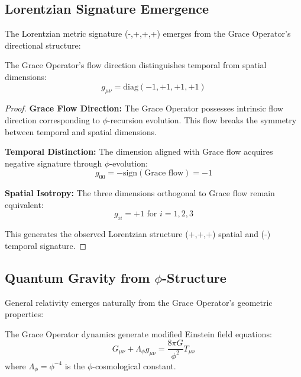 \subsection{Lorentzian Signature Emergence}

The Lorentzian metric signature (-,+,+,+) emerges from the Grace Operator's directional structure:

\begin{theorem}
The Grace Operator's flow direction distinguishes temporal from spatial dimensions:
\begin{equation}
g_{\mu\nu} = \text{diag}(-1, +1, +1, +1)
\label{eq:lorentzian_signature}
\end{equation}
\end{theorem}

\begin{proof}
\textbf{Grace Flow Direction:} The Grace Operator possesses intrinsic flow direction corresponding to $\phi$-recursion evolution. This flow breaks the symmetry between temporal and spatial dimensions.

\textbf{Temporal Distinction:} The dimension aligned with Grace flow acquires negative signature through $\phi$-evolution:
\begin{equation}
g_{00} = -\text{sign}(\text{Grace flow}) = -1
\end{equation}

\textbf{Spatial Isotropy:} The three dimensions orthogonal to Grace flow remain equivalent:
\begin{equation}
g_{ii} = +1 \text{ for } i = 1, 2, 3
\end{equation}

This generates the observed Lorentzian structure (+,+,+) spatial and (-) temporal signature.
\end{proof}

\subsection{Quantum Gravity from $\phi$-Structure}

General relativity emerges naturally from the Grace Operator's geometric properties:

\begin{theorem}
The Grace Operator dynamics generate modified Einstein field equations:
\begin{equation}
G_{\mu\nu} + \Lambda_\phi g_{\mu\nu} = \frac{8\pi G}{\phi^2} T_{\mu\nu}
\label{eq:phi_einstein_equations}
\end{equation}
where $\Lambda_\phi = \phi^{-4}$ is the $\phi$-cosmological constant.
\end{theorem}

